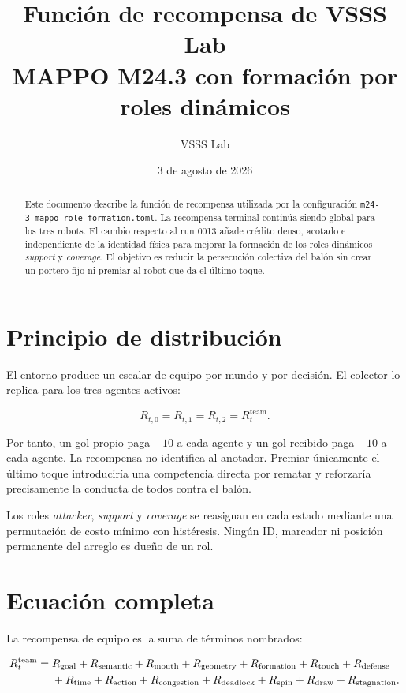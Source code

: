 \documentclass[11pt]{article}
\title{Función de recompensa de VSSS Lab\\
  \large MAPPO M24.3 con formación por roles dinámicos}
\author{VSSS Lab}
\date{3 de agosto de 2026}
\newcommand{\Rteam}{R_t^{\mathrm{team}}}
\begin{document}
\maketitle

\begin{abstract}
Este documento describe la función de recompensa utilizada por la configuración
\texttt{m24-3-mappo-role-formation.toml}. La recompensa terminal continúa siendo global para
los tres robots. El cambio respecto al run 0013 añade crédito denso, acotado e independiente de
la identidad física para mejorar la formación de los roles dinámicos \emph{support} y
\emph{coverage}. El objetivo es reducir la persecución colectiva del balón sin crear un portero
fijo ni premiar al robot que da el último toque.
\end{abstract}

\section{Principio de distribución}

El entorno produce un escalar de equipo por mundo y por decisión. El colector lo replica para
los tres agentes activos:

\begin{equation}
  R_{t,0}=R_{t,1}=R_{t,2}=\Rteam.
\end{equation}

Por tanto, un gol propio paga $+10$ a cada agente y un gol recibido paga $-10$ a cada agente.
La recompensa no identifica al anotador. Premiar únicamente el último toque introduciría una
competencia directa por rematar y reforzaría precisamente la conducta de todos contra el balón.

Los roles \emph{attacker}, \emph{support} y \emph{coverage} se reasignan en cada estado mediante
una permutación de costo mínimo con histéresis. Ningún ID, marcador ni posición permanente del
arreglo es dueño de un rol.

\section{Ecuación completa}

La recompensa de equipo es la suma de términos nombrados:

\begin{align}
\Rteam ={}& R_{\mathrm{goal}} + R_{\mathrm{semantic}}
 + R_{\mathrm{mouth}} + R_{\mathrm{geometry}} + R_{\mathrm{formation}}
 + R_{\mathrm{touch}} + R_{\mathrm{defense}} \notag\\
&+ R_{\mathrm{time}} + R_{\mathrm{action}}
 + R_{\mathrm{congestion}} + R_{\mathrm{deadlock}}
 + R_{\mathrm{spin}} + R_{\mathrm{draw}} + R_{\mathrm{stagnation}}.
\end{align}
\end{document}
